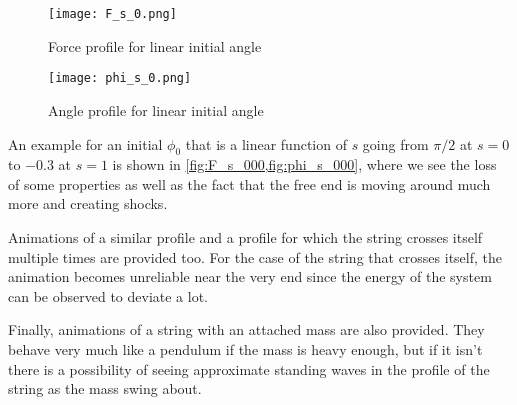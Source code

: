 \documentclass[10pt,a4paper,twocolumn]{article}
\begin{document}
\begin{figure}[!h]
    \centering
    \texttt{[image: F\_s\_0.png]}
    \caption{Force profile for linear initial angle}
    \label{fig:F_s_000}
\end{figure}

\begin{figure}[!t]
    \centering
    \texttt{[image: phi\_s\_0.png]}
    \caption{Angle profile for linear initial angle}
    \label{fig:phi_s_000}
\end{figure}

An example for an initial $\phi_0$ that is a linear function of $s$ going from $\pi/2$ at $s=0$ to $-0.3$ at $s=1$ is shown in \cref{fig:F_s_000,fig:phi_s_000}, where we see the loss of some properties as well as the fact that the free end is moving around much more and creating shocks.

Animations of a similar profile and a profile for which the string crosses itself multiple times are provided too. For the case of the string that crosses itself, the animation becomes unreliable near the very end since the energy of the system can be observed to deviate a lot.


Finally, animations of a string with an attached mass are also provided. They behave very much like a pendulum if the mass is heavy enough, but if it isn't there is a possibility of seeing approximate standing waves in the profile of the string as the mass swing about.
\end{document}
